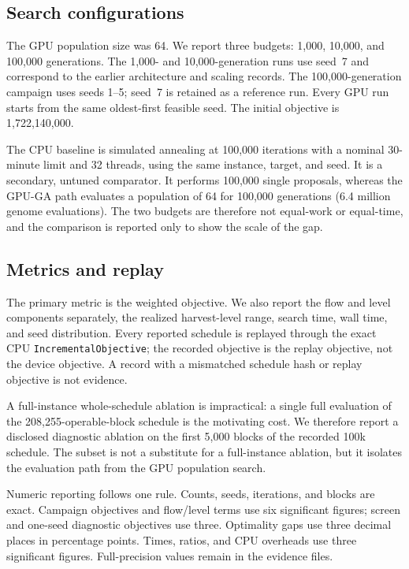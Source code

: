 \documentclass[11pt]{article}
\begin{document}
\subsection{Search configurations}

The GPU population size was 64. We report three budgets: 1,000, 10,000, and
100,000 generations. The 1,000- and 10,000-generation runs use seed~7 and
correspond to the earlier architecture and scaling records. The
100,000-generation campaign uses seeds 1--5; seed~7 is retained as a reference
run. Every GPU run starts from the same oldest-first feasible seed. The initial
objective is 1,722,140,000.

The CPU baseline is simulated annealing at 100,000 iterations with a nominal
30-minute limit and 32 threads, using the same instance, target, and seed. It is a
secondary, untuned comparator. It performs 100,000 single proposals, whereas the
GPU-GA path evaluates a population of 64 for 100,000 generations (6.4 million
genome evaluations). The two budgets are therefore not equal-work or equal-time,
and the comparison is reported only to show the scale of the gap.

\subsection{Metrics and replay}

The primary metric is the weighted objective. We also report the flow and
level components separately, the realized harvest-level range, search time, wall
time, and seed distribution. Every reported schedule is replayed through the
exact CPU \texttt{IncrementalObjective}; the recorded objective is the replay
objective, not the device objective. A record with a mismatched schedule hash or
replay objective is not evidence.

A full-instance whole-schedule ablation is impractical: a single full evaluation
of the 208,255-operable-block schedule is the motivating cost. We therefore
report a disclosed diagnostic ablation on the first 5,000 blocks of the recorded
100k schedule. The subset is not a substitute for a full-instance ablation, but
it isolates the evaluation path from the GPU population search.

Numeric reporting follows one rule. Counts, seeds, iterations, and blocks are exact. Campaign
objectives and flow/level terms use six significant figures; screen and one-seed diagnostic
objectives use three. Optimality gaps use three decimal places in percentage points. Times, ratios,
and CPU overheads use three significant figures. Full-precision values remain in the evidence files.
\end{document}
